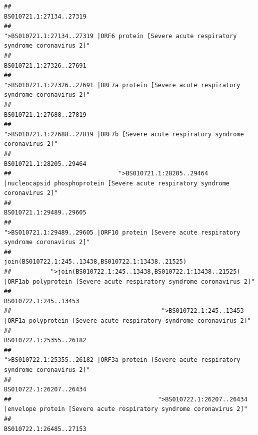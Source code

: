 \documentclass[
]{article}
\begin{document}
\begin{verbatim}
##                                                                                                                BS010721.1:27134..27319 
##                                             ">BS010721.1:27134..27319 |ORF6 protein [Severe acute respiratory syndrome coronavirus 2]" 
##                                                                                                                BS010721.1:27326..27691 
##                                            ">BS010721.1:27326..27691 |ORF7a protein [Severe acute respiratory syndrome coronavirus 2]" 
##                                                                                                                BS010721.1:27688..27819 
##                                                    ">BS010721.1:27688..27819 |ORF7b [Severe acute respiratory syndrome coronavirus 2]" 
##                                                                                                                BS010721.1:28205..29464 
##                              ">BS010721.1:28205..29464 |nucleocapsid phosphoprotein [Severe acute respiratory syndrome coronavirus 2]" 
##                                                                                                                BS010721.1:29489..29605 
##                                            ">BS010721.1:29489..29605 |ORF10 protein [Severe acute respiratory syndrome coronavirus 2]" 
##                                                                                    join(BS010722.1:245..13438,BS010722.1:13438..21525) 
##           ">join(BS010722.1:245..13438,BS010722.1:13438..21525) |ORF1ab polyprotein [Severe acute respiratory syndrome coronavirus 2]" 
##                                                                                                                  BS010722.1:245..13453 
##                                          ">BS010722.1:245..13453 |ORF1a polyprotein [Severe acute respiratory syndrome coronavirus 2]" 
##                                                                                                                BS010722.1:25355..26182 
##                                            ">BS010722.1:25355..26182 |ORF3a protein [Severe acute respiratory syndrome coronavirus 2]" 
##                                                                                                                BS010722.1:26207..26434 
##                                         ">BS010722.1:26207..26434 |envelope protein [Severe acute respiratory syndrome coronavirus 2]" 
##                                                                                                                BS010722.1:26485..27153 

\end{verbatim}
\end{document}
